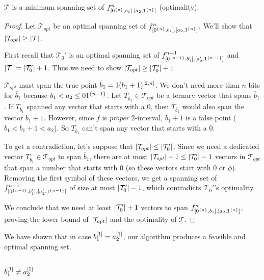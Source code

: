 \begin{theorem}
$\mathcal{T}$ is a minimum spanning set of
$f^{n}_{[0^{\{n\}}, b_1], [a_2, 1^{\{n\}}]}$ (optimality).
\end{theorem}

\begin{proof}
Let $\mathcal{T}_{opt}$ be an optimal spanning set of
$f^{n}_{[0^{\{n\}}, b_1], [a_2, 1^{\{n\}}]}$.
We'll show that
$\lvert\mathcal{T}_{opt}\rvert \geq \lvert\mathcal{T}\rvert$.

First recall that
$\mathcal{T}_0'$ is an optimal spanning set of
$f^{n-1}_{[0^{\{n-1\}}, b_1'], [a_2', 1^{\{n-1\}}]}$
and
$\lvert\mathcal{T}\rvert = \lvert\mathcal{T}_0'\rvert + 1$.
Thus we need to show
$\lvert\mathcal{T}_{opt}\rvert \geq \lvert\mathcal{T}_0'\rvert + 1$

$\mathcal{T}_{opt}$ must span the true point
$\bar{b}_1 = 1 (b_1 + 1)^{[2, n]}$.
We don't need more than $n$ bits for $\bar{b}_1$
because $b_1 < a_2 \leq 0 1^{\{n-1\}}$.
Let $T_{\bar{b}_1} \in \mathcal{T}_{opt}$
be a ternary vector that spans $\bar{b}_1$.
If $T_{\bar{b}_1}$ spanned
any vector that starts with a $0$,
then $T_{\bar{b}_1}$ would also span
the vector $b_1 + 1$.
However,
since $f$ is \emph{proper} $2$-interval,
$b_1 + 1$ is a false point ($b_1 < b_1 + 1 < a_2$).
So $T_{\bar{b}_1}$
can't span any vector that starts with a $0$.

To get a contradiction,
let's suppose that
$\lvert\mathcal{T}_{opt}\rvert \leq \lvert\mathcal{T}_0'\rvert$.
Since we need a dedicated vector
$T_{\bar{b}_1} \in \mathcal{T}_{opt}$ to span $\bar{b}_1$,
there are at most
$\lvert\mathcal{T}_{opt}\rvert - 1
\leq \lvert\mathcal{T}_0'\rvert - 1$
vectors in $\mathcal{T}_{opt}$ that span a number
that starts with $0$
(so these vectors start with $0$ or $\phi$).
Removing the first symbol of these vectors,
we get a spanning set of
$f^{n-1}_{[0^{\{n-1\}}, b_1'], [a_2', 1^{\{n-1\}}]}$
of size at most $\lvert\mathcal{T}_0'\rvert - 1$,
which contradicts $\mathcal{T}_0'$'s optimality.

We conclude that we need at least
$\lvert\mathcal{T}_0'\rvert + 1$ vectors to span
$f^{n}_{[0^{\{n\}}, b_1], [a_2, 1^{\{n\}}]}$,
proving the lower bound of
$\lvert\mathcal{T}_{opt}\rvert$
and the optimality of $\mathcal{T}$.
\end{proof}

We have shown that in case $b_1^{[1]} = a_2^{[1]}$,
our algorithm produces a feasible and optimal spanning set.

\subsection{\texorpdfstring{$b_1^{[1]}
\neq a_2^{[1]}$}
{b1[1] != a2[1]}
}

